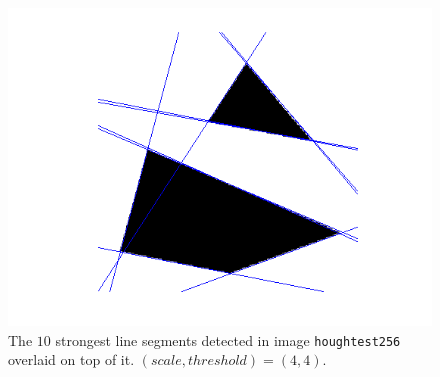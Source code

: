     \begin{figure}[H]
      \centering
      \includegraphics[scale=0.8]{./images/Q8/houghtest256/1.png}
      \caption{The $10$ strongest line segments detected in image
        \texttt{houghtest256} overlaid on top of it. $(scale, threshold) = (4,4)$.}
      \label{fig:Q8_houghtest256}
    \end{figure}

